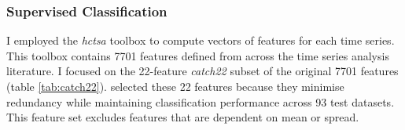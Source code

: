 \subsubsection{Supervised Classification}
\label{sec:graphclustering-supervised}

I employed the \emph{hctsa} toolbox \citep{fulcherHctsaComputationalFramework2017} to compute vectors of features for each time series.
This toolbox contains 7701 features defined from across the time series analysis literature.
I focused on the 22-feature \emph{catch22} subset of the original 7701 features (table \ref{tab:catch22}).
\citet{lubbaCatch22CAnonicalTimeseries2019} selected these 22 features because they minimise redundancy while maintaining classification performance across 93 test datasets.
This feature set excludes features that are dependent on mean or spread.

